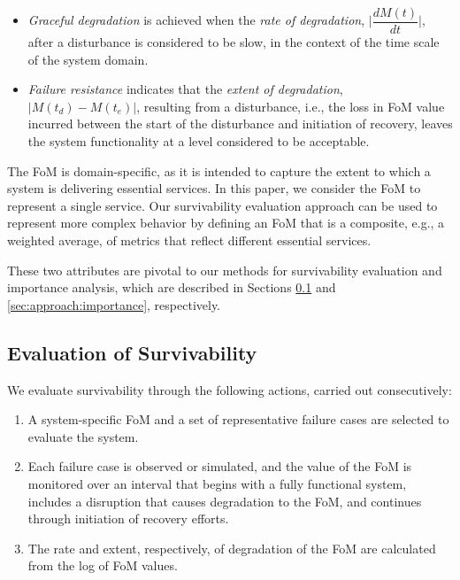 \documentclass[review]{elsarticle}
\begin{document}
\begin{itemize}[leftmargin = *]
    \item \emph{Graceful degradation} is achieved when the \emph{rate of degradation}, $\Big|\dfrac{dM(t)}{dt}\Big|$, after a disturbance is considered to be slow, in the context of the time scale of the system domain.
    \item \emph{Failure resistance} indicates that the \emph{extent of degradation}, $|M(t_d) - M(t_e)|$, resulting from a disturbance, i.e., the loss in FoM value incurred between the start of the disturbance and initiation of recovery, leaves the system functionality at a level considered to be acceptable.
\end{itemize}

The FoM is domain-specific, as it is intended to capture the extent to which a system is delivering essential services. In this paper, we consider the FoM to represent a single service. Our survivability evaluation approach can be used to represent more complex behavior by defining an FoM that is a composite, e.g., a weighted average, of metrics that reflect different essential services.

These two attributes are pivotal to our methods for survivability evaluation and importance analysis, which are described in Sections \ref{sec:approach:eval} and \ref{sec:approach:importance}, respectively.

\subsection{Evaluation of Survivability}
\label{sec:approach:eval}
We evaluate survivability through the following actions, carried out consecutively:
\begin{enumerate}
    \item A system-specific FoM and a set of representative failure cases are selected to evaluate the system.
    \item Each failure case is observed or simulated, and the value of the FoM is monitored over an interval that begins with a fully functional system, includes a disruption that causes degradation to the FoM, and continues through initiation of recovery efforts.
    \item The rate and extent, respectively, of degradation of the FoM are calculated from the log of FoM values.
\end{enumerate}
\end{document}
